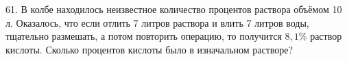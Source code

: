 61.  В колбе находилось неизвестное количество процентов раствора объёмом 10 л. Оказалось, что
если отлить 7 литров раствора и влить 7 литров воды, тщательно размешать, а потом повторить
операцию, то получится $8,1\%$ раствор кислоты. Сколько процентов кислоты было в изначальном растворе?\\
